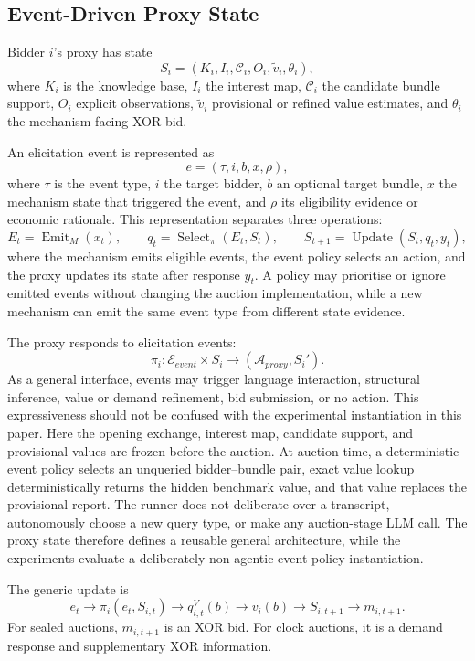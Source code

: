 \subsection{Event-Driven Proxy State}

Bidder \(i\)'s proxy has state
\[
S_i=(K_i,I_i,\mathcal{C}_i,O_i,\tilde v_i,\theta_i),
\]
where \(K_i\) is the knowledge base, \(I_i\) the interest map, \(\mathcal{C}_i\) the candidate bundle support, \(O_i\) explicit observations, \(\tilde v_i\) provisional or refined value estimates, and \(\theta_i\) the mechanism-facing XOR bid.

An elicitation event is represented as
\[
e=(\tau,i,b,x,\rho),
\]
where \(\tau\) is the event type, \(i\) the target bidder, \(b\) an optional
target bundle, \(x\) the mechanism state that triggered the event, and
\(\rho\) its eligibility evidence or economic rationale. This representation
separates three operations:
\[
E_t=\operatorname{Emit}_M(x_t),\qquad
q_t=\operatorname{Select}_{\pi}(E_t,S_t),\qquad
S_{t+1}=\operatorname{Update}(S_t,q_t,y_t),
\]
where the mechanism emits eligible events, the event policy selects an action,
and the proxy updates its state after response \(y_t\). A policy may prioritise
or ignore emitted events without changing the auction implementation, while a
new mechanism can emit the same event type from different state evidence.

The proxy responds to elicitation events:
\[
\pi_i:\mathcal{E}_{event}\times S_i \to (\mathcal{A}_{proxy},S_i').
\]
As a general interface, events may trigger language interaction, structural
inference, value or demand refinement, bid submission, or no action. This
expressiveness should not be confused with the experimental instantiation in
this paper. Here the opening exchange, interest map, candidate support, and
provisional values are frozen before the auction. At auction time, a
deterministic event policy selects an unqueried bidder--bundle pair, exact
value lookup deterministically returns the hidden benchmark value, and that
value replaces the provisional report. The runner does not deliberate over a
transcript, autonomously choose a new query type, or make any auction-stage LLM
call. The proxy state therefore defines a reusable general architecture, while
the experiments evaluate a deliberately non-agentic event-policy
instantiation.

The generic update is
\[
e_t \to \pi_i(e_t,S_{i,t}) \to q^V_{i,t}(b) \to v_i(b)
\to S_{i,t+1} \to m_{i,t+1}.
\]
For sealed auctions, \(m_{i,t+1}\) is an XOR bid. For clock auctions, it is a demand response and supplementary XOR information.

